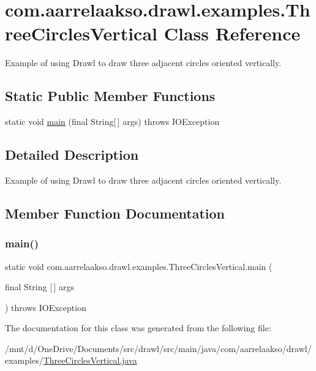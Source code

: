 \hypertarget{classcom_1_1aarrelaakso_1_1drawl_1_1examples_1_1_three_circles_vertical}{}\section{com.\+aarrelaakso.\+drawl.\+examples.\+Three\+Circles\+Vertical Class Reference}
\label{classcom_1_1aarrelaakso_1_1drawl_1_1examples_1_1_three_circles_vertical}


Example of using Drawl to draw three adjacent circles oriented vertically.  


\subsection*{Static Public Member Functions}
\begin{DoxyCompactItemize}
\item 
static void \hyperlink{classcom_1_1aarrelaakso_1_1drawl_1_1examples_1_1_three_circles_vertical_aa93a6ab32c6fbd8f349ca853361f4523}{main} (final String\mbox{[}$\,$\mbox{]} args)  throws I\+O\+Exception 
\end{DoxyCompactItemize}


\subsection{Detailed Description}
Example of using Drawl to draw three adjacent circles oriented vertically. 

\subsection{Member Function Documentation}
\mbox{\label{classcom_1_1aarrelaakso_1_1drawl_1_1examples_1_1_three_circles_vertical_aa93a6ab32c6fbd8f349ca853361f4523}} 
\subsubsection{\texorpdfstring{main()}{main()}}
{\footnotesize\ttfamily static void com.\+aarrelaakso.\+drawl.\+examples.\+Three\+Circles\+Vertical.\+main (\begin{DoxyParamCaption}\item[{final String \mbox{[}$\,$\mbox{]}}]{args }\end{DoxyParamCaption}) throws I\+O\+Exception\hspace{0.3cm}{\ttfamily [static]}}



The documentation for this class was generated from the following file\+:\begin{DoxyCompactItemize}
\item 
/mnt/d/\+One\+Drive/\+Documents/src/drawl/src/main/java/com/aarrelaakso/drawl/examples/\hyperlink{_three_circles_vertical_8java}{Three\+Circles\+Vertical.\+java}\end{DoxyCompactItemize}
